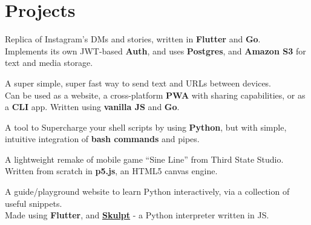 \documentclass[]{resume}
\begin{document}
\begin{minipage}[t]{0.62\textwidth}

\section{Projects}

Replica of Instagram's DMs and stories, written in \textbf{Flutter} and \textbf{Go}.\\
Implements its own JWT-based \textbf{Auth}, and uses \textbf{Postgres}, and \textbf{Amazon S3} for text and media storage.
\sectionsep

A super simple, super fast way to send text and URLs between devices.\\
Can be used as a website, a cross-platform \textbf{PWA} with sharing capabilities, or as a \textbf{CLI} app. Written using \textbf{vanilla JS} and \textbf{Go}.
\sectionsep

A tool to Supercharge your shell scripts by using \textbf{Python}, but with simple, intuitive integration of \textbf{bash commands} and pipes.
\sectionsep

A lightweight remake of mobile game “Sine Line” from Third State Studio.\\
Written from scratch in \textbf{p5.js}, an HTML5 canvas engine.
\sectionsep

A guide/playground website to learn Python interactively, via a collection of useful snippets.\\
Made using \textbf{Flutter}, and \href{https://skulpt.org}{\textbf{Skulpt}} - a Python interpreter written in JS.
\sectionsep




\end{minipage}
\end{document}
